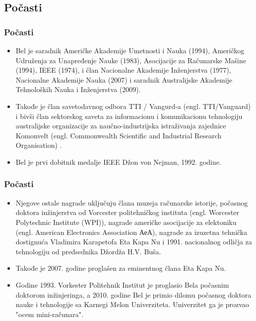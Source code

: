 \documentclass{beamer}
\begin{document}
\subsection{Počasti}
\begin{frame}[fragile]\frametitle{Počasti}
	\begin{itemize}	
		\item Bel je saradnik Američke Akademije Umetnosti i Nauka (1994), Američkog Udruženja za Unapređenje Nauke (1983), Asocijacije za Računarske Mašine (1994), IEEE (1974), i član Nacionalne Akademije Inženjerstva (1977), Nacionalne Akademije Nauka (2007) i saradnik Australijske Akademije Tehnoloških Nauka i Inženjerstva (2009).
		\item Takođe je član savetodavnog odbora TTI / Vangurd-a (engl. TTI/Vanguard) i bivši član sektorskog saveta za informacionu i komunikacionu tehnologiju australijske organizacije za naučno-industrijska istraživanja zajednice Komonvelt (engl. Commonwealth Scientific and Industrial Research Organisation) .
		\item Bel je prvi dobitnik medalje IEEE Džon von Nejman, 1992. godine.
	\end{itemize}
\end{frame}
\begin{frame}[fragile]\frametitle{Počasti}
	\begin{itemize}	
		\item Njegove ostale nagrade uključuju člana muzeja računarske istorije, počasnog doktora inžinjerstva od Vorcester politehničkog instituta (engl. Worcester Polytechnic Institute (WPI)), nagrade američke asocijacije za elektoniku (engl. American Electronics Association АеА), nagrade za izuzetna tehnička dostignuća Vladimira Karapetofa Eta Kapa Nu i 1991. nacionalnog odličja za tehnologiju od predsednika Džordža H.V. Buša.
		\item Takođe je 2007. godine proglašen za eminentnog člana Eta Kapa Nu.
		\item Godine 1993. Vorkester Politehnik Institut je proglasio Bela počasnim doktorom inžinjeringa, a 2010. godine Bel je primio dilomu počasnog doktora nauke i tehnologije sa Karnegi Melon Univerziteta. Univerzitet ga je prozvao "ocem mini-računara".
	\end{itemize}
\end{frame}
\end{document}
